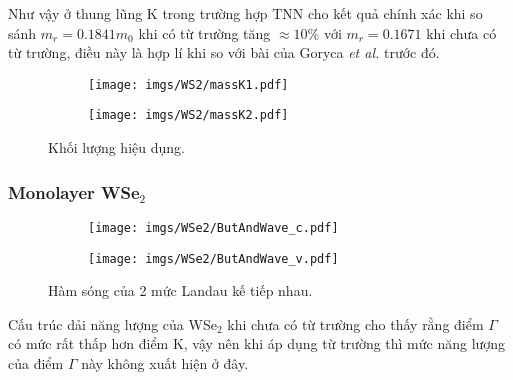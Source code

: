 \documentclass{article}
\begin{document}
Như vậy ở thung lũng K trong trường hợp TNN cho kết quả chính xác khi so sánh $m_{r} =0.1841 m_{0}$ khi có từ trường tăng $\approx 10\%$ với $m_{r} = 0.1671$ khi chưa có từ trường, điều này là hợp lí khi so với bài của Goryca \textit{et al.}\cite{goryca2019} trước đó.

\begin{figure}[htb]
	\begin{subfigure}{0.495\textwidth}
		\centering
		\texttt{[image: imgs/WS2/massK1.pdf]}
	\end{subfigure}
	\begin{subfigure}{0.495\textwidth}
		\centering
		\texttt{[image: imgs/WS2/massK2.pdf]}
	\end{subfigure}
	\caption{Khối lượng hiệu dụng.}
\end{figure}
\newpage
\subsubsection*{Monolayer WSe$_{2}$}
\begin{figure}[htb]
	\begin{subfigure}{0.495\textwidth}
		\centering
		\texttt{[image: imgs/WSe2/ButAndWave\_c.pdf]}
	\end{subfigure}
	\begin{subfigure}{0.495\textwidth}
		\centering
		\texttt{[image: imgs/WSe2/ButAndWave\_v.pdf]}
	\end{subfigure}
	\caption{Hàm sóng của 2 mức Landau kế tiếp nhau.}
\end{figure}
Cấu trúc dải năng lượng của WSe$_{2}$ khi chưa có từ trường cho thấy rằng điểm $\Gamma$ có mức rất thấp hơn điểm K, vậy nên khi áp dụng từ trường thì mức năng lượng của điểm $\Gamma$ này không xuất hiện ở đây. 
\end{document}
